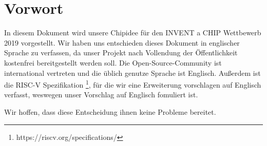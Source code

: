 \section*{Vorwort}
In diesem Dokument wird unsere Chipidee für den INVENT a CHIP Wettbewerb 2019 vorgestellt.
Wir haben uns entschieden dieses Dokument in englischer Sprache zu verfassen, da unser
Projekt nach Vollendung der Öffentlichkeit kostenfrei bereitgestellt werden soll. Die
Open-Source-Community ist international vertreten und die üblich genutze Sprache ist 
Englisch. Außerdem ist die RISC-V Spezifikation \footnote{https://riscv.org/specifications/}, 
für die wir eine Erweiterung vorschlagen auf Englisch verfasst, weswegen unser Vorschlag
auf Englisch fomuliert ist.

Wir hoffen, dass diese Entscheidung ihnen keine Probleme bereitet. 